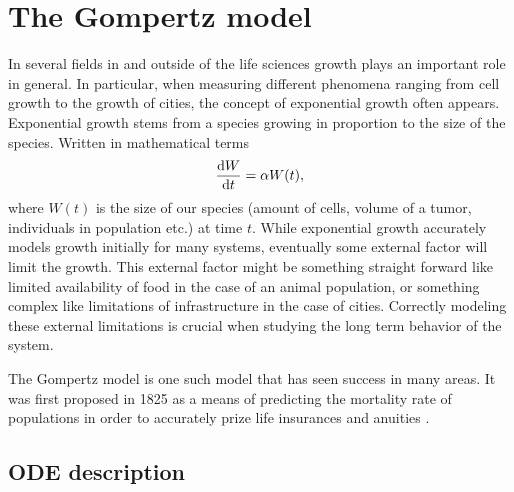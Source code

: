 \chapter{The Gompertz model}

In several fields in and outside of the life sciences growth plays an important role in general.
In particular, when measuring different phenomena ranging from cell growth to the growth of cities, the concept of exponential growth often appears.
Exponential growth stems from a species growing in proportion to the size of the species.
Written in mathematical terms
\begin{equation}
  \dv{W}{t} = \alpha W(t),
\end{equation}
where \(W(t)\) is the size of our species (amount of cells, volume of a tumor, individuals in population etc.) at time \(t\).
While exponential growth accurately models growth initially for many systems, eventually some external factor will limit the growth.
This external factor might be something straight forward like limited availability of food in the case of an animal population, or something complex like limitations of infrastructure in the case of cities. %
Correctly modeling these external limitations is crucial when studying the long term behavior of the system.

The Gompertz model is one such model that has seen success in many areas. %
It was first proposed in 1825 as a means of predicting the mortality rate of populations in order to accurately prize life insurances and anuities \cite{gompertz1825nature}.


\section{ODE description}

